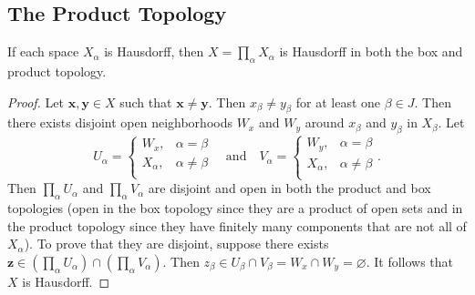 \subsection{The Product Topology}
\begin{ex}{19.3}
    If each space $X_\alpha$ is Hausdorff, then $X =\prod_\alpha X_\alpha$ is Hausdorff 
    in both the box and product topology.
\end{ex}
\begin{proof}
    Let $\mathbf{x}, \mathbf{y}\in X$ such that $\mathbf{x}\neq\mathbf{y}$. 
    Then $x_\beta\neq y_\beta$ for at least one $\beta\in J$.
    Then there exists disjoint open neighborhoods $W_x$ and $W_y$ around $x_\beta$ 
    and $y_\beta$ in  $X_\beta$. Let
    $$
    U_\alpha=
    \begin{cases}
        W_x,&\alpha=\beta\\
        X_\alpha,&\alpha\neq\beta\\
    \end{cases}
    \quad\text{and}\quad 
    V_\alpha= 
    \begin{cases}
        W_y,&\alpha=\beta\\
        X_\alpha,&\alpha\neq\beta\\
    \end{cases}.
    $$
    Then $\prod_\alpha U_\alpha$ and $\prod_\alpha V_\alpha$ are disjoint and open in both the 
    product and box topologies
    (open in the box topology since they are a product of open sets and in the product topology 
    since they have finitely many components that are not all of $X_\alpha$).
    To prove that they are disjoint, suppose there exists 
    $\mathbf{z}\in\left(\prod_\alpha U_\alpha\right)\cap\left(\prod_\alpha V_\alpha\right)$.
    Then $z_\beta\in U_\beta\cap V_\beta=W_x\cap W_y=\varnothing$.
    It follows that $X$ is Hausdorff.
\end{proof}

